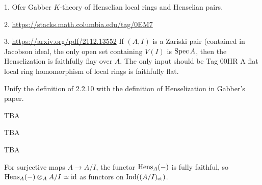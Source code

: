 1. Ofer Gabber \(K\)-theory of Henselian local rings and Henselian pairs.

2. \url{https://stacks.math.columbia.edu/tag/0EM7}

3. \url{https://arxiv.org/pdf/2112.13552} If \((A,I)\) is a Zariski pair (contained in Jacobson ideal, the only open set containing \(V(I)\) is \(\operatorname{Spec} A\), then the Henselization is faithfully flay over \(A\). The only input should be Tag 00HR A flat local ring homomorphism of local rings is faithfully flat.

Unify the definition of 2.2.10 with the definition of Henselization in Gabber's paper.

\begin{definition}
    \label{def:henselian-pair}

    TBA
\end{definition}

\begin{definition}
    \label{def:henselization}

    TBA

\end{definition}

\begin{theorem}
    \label{thm:henselization-is-henselian}
    TBA

\end{theorem}

\begin{lemma}
    \label{lem:henselization-fully-faithful}

    For surjective maps $A \to A/I$, the functor $\operatorname{Hens}_A(-)$ is fully faithful, so $\operatorname{Hens}_A(-) \otimes_A A/I \simeq \mathrm{id}$ as functors on $\mathrm{Ind}((A/I)_{\mathrm{et}})$.
\end{lemma}

